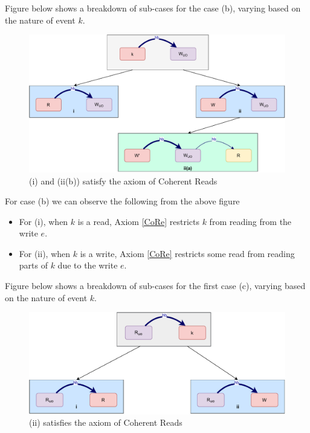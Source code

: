     Figure below shows a breakdown of sub-cases for the case (b), varying based
    on the nature of event $k$.
    \begin{figure}[H]
        \centering
        \includegraphics[scale=0.6]{5.InstructionReordering/4.ValidReorderingCandidate/ProofParts/Part4/part4(b).pdf}
        \caption{(i) and (ii(b)) satisfy the axiom of Coherent Reads}
        \label{fig:my_label}
    \end{figure}
          
    For case (b) we can observe the following from the above figure 
    \begin{itemize}
        \item For (i), when $k$ is a read, Axiom \ref{CoRe} restricts $k$ from reading from the write $e$. 
        \item For (ii), when $k$ is a write, Axiom \ref{CoRe} restricts some read from reading parts of $k$ due to the write $e$.   
    \end{itemize}

    Figure below shows a breakdown of sub-cases for the first case (c), varying based
    on the nature of event $k$.
    \begin{figure}[H]
        \centering
        \includegraphics[scale=0.6]{5.InstructionReordering/4.ValidReorderingCandidate/ProofParts/Part4/part4(c).pdf}
        \caption{(ii) satisfies the axiom of Coherent Reads}
        \label{fig:my_label}
    \end{figure}
    
